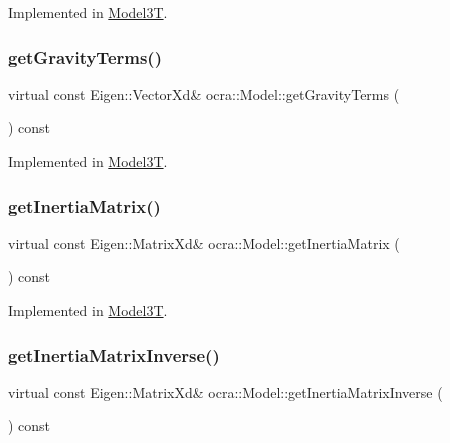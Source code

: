 Implemented in \hyperlink{classModel3T_aa2b2a35af047f4fd539131e87ee3af2a}{Model3T}.

\hypertarget{classocra_1_1Model_aef569d0c71ab76665e4a24d178e8243d}{}\label{classocra_1_1Model_aef569d0c71ab76665e4a24d178e8243d} 
\subsubsection{\texorpdfstring{get\+Gravity\+Terms()}{getGravityTerms()}}
{\footnotesize\ttfamily virtual const Eigen\+::\+Vector\+Xd\& ocra\+::\+Model\+::get\+Gravity\+Terms (\begin{DoxyParamCaption}{ }\end{DoxyParamCaption}) const\hspace{0.3cm}{\ttfamily [pure virtual]}}



Implemented in \hyperlink{classModel3T_a593775a88272c140518b679ad910a89c}{Model3T}.

\hypertarget{classocra_1_1Model_adf59aeee10c9d3babb05d7249bf71106}{}\label{classocra_1_1Model_adf59aeee10c9d3babb05d7249bf71106} 
\subsubsection{\texorpdfstring{get\+Inertia\+Matrix()}{getInertiaMatrix()}}
{\footnotesize\ttfamily virtual const Eigen\+::\+Matrix\+Xd\& ocra\+::\+Model\+::get\+Inertia\+Matrix (\begin{DoxyParamCaption}{ }\end{DoxyParamCaption}) const\hspace{0.3cm}{\ttfamily [pure virtual]}}



Implemented in \hyperlink{classModel3T_a0ba3b76d91e6121e472ab316e17382e1}{Model3T}.

\hypertarget{classocra_1_1Model_ac1b1137365a6f6765d41d68bc02f3e62}{}\label{classocra_1_1Model_ac1b1137365a6f6765d41d68bc02f3e62} 
\subsubsection{\texorpdfstring{get\+Inertia\+Matrix\+Inverse()}{getInertiaMatrixInverse()}}
{\footnotesize\ttfamily virtual const Eigen\+::\+Matrix\+Xd\& ocra\+::\+Model\+::get\+Inertia\+Matrix\+Inverse (\begin{DoxyParamCaption}{ }\end{DoxyParamCaption}) const\hspace{0.3cm}{\ttfamily [pure virtual]}}




